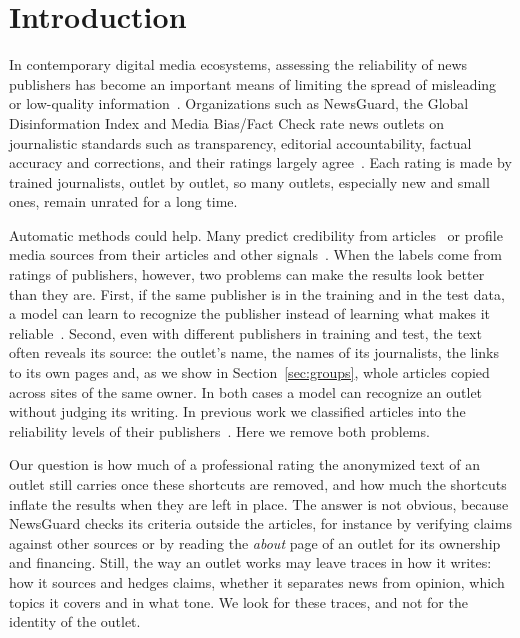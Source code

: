 \documentclass[11pt,a4paper]{article}
\begin{document}
\section{Introduction}\label{sec:intro}

In contemporary digital media ecosystems, assessing the reliability of news publishers has become an important means
of limiting the spread of misleading or low-quality information~\cite{Bowman2003,Jemielniak2020}. Organizations such as
NewsGuard, the Global Disinformation Index and Media Bias/Fact Check rate news outlets on journalistic standards such as
transparency, editorial accountability, factual accuracy and corrections, and their ratings largely
agree~\cite{lin2023high,DBLP:conf/icwsm/PratelliP22}. Each rating is made by trained journalists, outlet by outlet, so
many outlets, especially new and small ones, remain unrated for a long time.

Automatic methods could help. Many predict credibility from articles~\cite{pandolfi2020automatic,Przybyla2021plugin,
10.1145/3770077,DBLP:journals/dbsk/AdjiLS26} or profile media sources from their articles and other
signals~\cite{baly2018predicting,baly2020written,nakov2024survey}. When the labels come from ratings of publishers,
however, two problems can make the results look better than they are. First, if the same publisher is in the training
and in the test data, a model can learn to recognize the publisher instead of learning what makes it
reliable~\cite{zhou2021hidden,azizov-etal-2024-safari,verhoeven2025yesterday}. Second, even with different publishers
in training and test, the text often reveals its source: the outlet's name, the names of its journalists, the links to
its own pages and, as we show in Section~\ref{sec:groups}, whole articles copied across sites of the same owner. In both
cases a model can recognize an outlet without judging its writing. In previous work we classified articles into the
reliability levels of their publishers~\cite{Bianchi2024SAC}. Here we remove both problems.

Our question is how much of a professional rating the anonymized text of an outlet still carries once these
shortcuts are removed, and how much the shortcuts inflate the results when they are left in place. The answer is not
obvious, because NewsGuard checks its criteria outside the articles, for instance by verifying claims against other
sources or by reading the \emph{about} page of an outlet for its ownership and financing. Still, the way an outlet works
may leave traces in how it writes: how it sources and hedges claims, whether it separates news from opinion, which
topics it covers and in what tone. We look for these traces, and not for the identity of the outlet.
\end{document}
